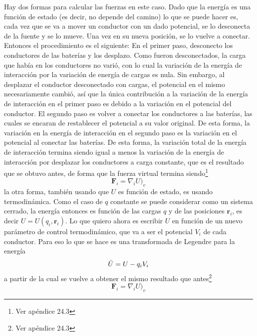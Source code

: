 \indent Hay dos formas para calcular las fuerzas en este caso. Dado que la energía es una función de estado (es decir, no depende del camino) lo que se puede hacer es, cada vez que se va a mover un conductor con un dado potencial, se lo desconecta de la fuente y se lo mueve. Una vez en su nueva posición, se lo vuelve a conectar. Entonces el procedimiento es el siguiente: En el primer paso, desconecto los conductores de las baterías y los desplazo. Como fueron desconectados, la carga que había en los conductores no varió, con lo cual la variación de la energía de interacción por la variación de energía de cargas es nula. Sin embargo, al desplazar el conductor desconectado con cargas, el potencial en el mismo necesariamente cambió, así que la única contribución a la variación de la energía de interacción en el primer paso es debido a la variación en el potencial del conductor. El segundo paso es volver a conectar los conductores a las baterías, las cuales se encaran de restablecer el potencial a su valor original. De esta forma, la variación en la energía de interacción en el segundo paso es la variación en el potencial al conectar las baterías. De esta forma, la variación total de la energía de interacción termina siendo igual a menos la variación de la energía de interacción por desplazar los conductores a carga constante, que es el resultado que se obtuvo antes, de forma que la fuerza virtual termina siendo\footnote{Ver apéndice 24.3}
\begin{equation*}
    \textbf{F}_{i} = \nabla_{i}U\big)_{v}
\end{equation*}
la otra forma, también usando que $U$ es función de estado, es usando termodinámica. Como el caso de $q$ constante se puede considerar como un sistema cerrado, la energía entonces es función de las cargas $q$ y de las posiciones $\textbf{r}_{i}$, es decir $U = U(q_{i},\textbf{r}_{i})$. Lo que quiero ahora es escribir $U$ en función de un nuevo parámetro de control termodinámico, que va a ser el potencial $V_{i}$ de cada conductor. Para eso lo que se hace es una transformada de Legendre para la energía
\begin{equation*}
    \Tilde{U} = U -q_{i}V_{i}
\end{equation*}
a partir de la cual se vuelve a obtener el mismo resultado que antes\footnote{Ver apéndice 24.3}
\begin{equation*}
    \textbf{F}_{i} = \nabla_{i}U\big)_{v}
\end{equation*}




